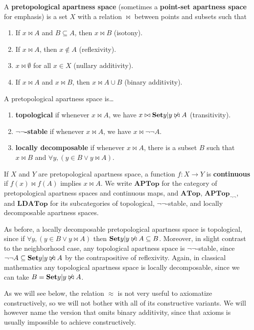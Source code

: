 \documentclass{article}
\def\cpl#1{\neg #1}
\def\nn{\ensuremath{\neg\neg}}
\def\APTop{\mathbf{APTop}}
\def\ATop{\mathbf{ATop}}
\def\APTopnn{\mathbf{APTop}_{\nn}}
\def\LDATop{\mathbf{LDATop}}
\begin{document}
\begin{defn}
  A \textbf{pretopological apartness space} (sometimes a \textbf{point-set apartness space} for emphasis) is a set $X$ with a relation $\bowtie$ between points and subsets such that
  \begin{enumerate}
  \item If $x\bowtie A$ and $B\subseteq A$, then $x\bowtie B$ (isotony).
  \item If $x\bowtie A$, then $x\notin A$ (reflexivity).
  \item $x\bowtie \emptyset$ for all $x\in X$ (nullary additivity).
  \item If $x\bowtie A$ and $x\bowtie B$, then $x\bowtie A\cup B$ (binary additivity).
  \end{enumerate}
  A pretopological apartness space is\dots
  \begin{enumerate}[resume]
  \item \textbf{topological} if whenever $x\bowtie A$, we have $x\bowtie \setof{ y | y \not\bowtie A }$ (transitivity).
  \item \textbf{\nn-stable} if whenever $x\bowtie A$, we have $x\bowtie \cpl{\cpl{A}}$.
  \item \textbf{locally decomposable} if whenever $x\bowtie A$, there is a subset $B$ such that $x\bowtie B$ and $\forall y, (y\in B \lor y\bowtie A)$.
  \end{enumerate}
  If $X$ and $Y$ are pretopological apartness space, a function $f:X\to Y$ is \textbf{continuous} if $f(x)\bowtie f(A)$ implies $x\bowtie A$.
  We write $\APTop$ for the category of pretopological apartness spaces and continuous maps, and $\ATop$, $\APTopnn$, and $\LDATop$ for its subcategories of topological, \nn-stable, and locally decomposable apartness spaces.
\end{defn}

As before, a locally decomposable pretopological apartness space is topological, since if $\forall y, (y\in B \lor y\bowtie A)$ then $\setof{ y | y \not\bowtie A } \subseteq B$.
Moreover, in slight contrast to the neighborhood case, any topological apartness space is \nn-stable, since $\cpl{\cpl{A}}\subseteq \setof{ y | y \not\bowtie A }$ by the contrapositive of reflexivity.
Again, in classical mathematics any topological apartness space is locally decomposable, since we can take $B = \setof{y|y\not\bowtie A}$.

As we will see below, the relation $\approx$ is not very useful to axiomatize constructively, so we will not bother with all of its constructive variants.
We will however name the version that omits binary additivity, since that axioms is usually impossible to achieve constructively.
\end{document}
